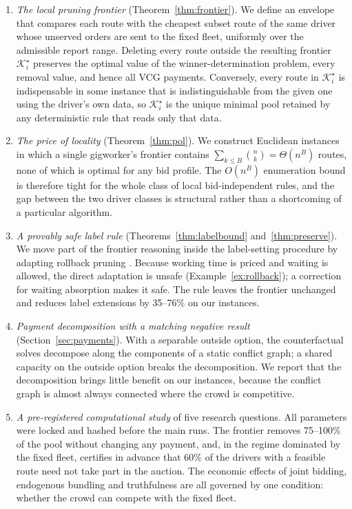 \documentclass[review,12pt]{elsarticle}
\theoremstyle{definition}
\theoremstyle{remark}
\newcommand{\Kstar}{\mathcal{K}^\star}
\begin{document}
\begin{enumerate}
\item \emph{The local pruning frontier} (Theorem~\ref{thm:frontier}). We
define an envelope that compares each route with the cheapest subset route
of the same driver whose unserved orders are sent to the fixed fleet,
uniformly over the admissible report range. Deleting every route outside
the resulting frontier $\Kstar_i$ preserves the optimal value of the
winner-determination problem, every removal value, and hence all VCG
payments. Conversely, every route in $\Kstar_i$ is indispensable in some
instance that is indistinguishable from the given one using the driver's
own data, so $\Kstar_i$ is the unique minimal pool retained by any
deterministic rule that reads only that data.
\item \emph{The price of locality} (Theorem~\ref{thm:pol}). We construct
Euclidean instances in which a single gigworker's frontier contains
$\sum_{k\le B}\binom nk=\Theta(n^B)$ routes, none of which is optimal for any
bid profile. The $O(n^B)$ enumeration bound is therefore tight for the
whole class of local bid-independent rules, and the gap between the two
driver classes is structural rather than a shortcoming of a particular
algorithm.
\item \emph{A provably safe label rule} (Theorems~\ref{thm:labelbound}
and~\ref{thm:preserve}). We move part of the frontier reasoning inside the
label-setting procedure by adapting rollback pruning
\citep{lozano2016exact}. Because working time is priced and waiting is
allowed, the direct adaptation is unsafe (Example~\ref{ex:rollback}); a
correction for waiting absorption makes it safe. The rule leaves the
frontier unchanged and reduces label extensions by 35--76\% on our
instances.
\item \emph{Payment decomposition with a matching negative result}
(Section~\ref{sec:payments}). With a separable outside option, the
counterfactual solves decompose along the components of a static conflict
graph; a shared capacity on the outside option breaks the decomposition.
We report that the decomposition brings little benefit on our instances,
because the conflict graph is almost always connected where the crowd is
competitive.
\item \emph{A pre-registered computational study} of five research
questions. All parameters were locked and hashed before the main runs.
The frontier removes 75--100\% of the pool without changing any payment,
and, in the regime dominated by the fixed fleet, certifies in advance that
60\% of the drivers with a feasible route need not take part in the
auction. The economic effects of joint bidding, endogenous bundling and
truthfulness are all governed by one condition: whether the crowd can
compete with the fixed fleet.
\end{enumerate}
\end{document}
